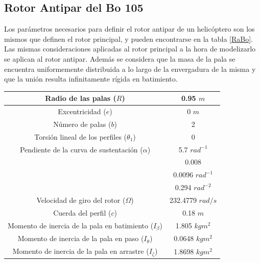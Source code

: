 \subsection{Rotor Antipar del Bo 105}

Los parámetros necesarios para definir el rotor antipar de un helicóptero son los mismos que definen el rotor principal, y pueden encontrarse en la tabla \ref{RaBo}.
Las mismas consideraciones aplicadas al rotor principal a la hora de modelizarlo se aplican al rotor antipar. Además se considera que la masa de la pala se encuentra uniformemente distribuida a lo largo de la envergadura de la misma y que la unión resulta infinitamente rígida en batimiento.
\begin{table}[htbp]
	\centering
	\begin{tabular}{|>{\columncolor{Gray}}c|c|}
		\hline
		\cellcolor{Gray}Radio de las palas ($R$) & \cellcolor[rgb]{ 1,  1,  1}0.95 $m$ \\ \hline
		\cellcolor{Gray}Excentricidad ($e$)& \cellcolor[rgb]{ 1,  1,  1}0 $m$ \\ \hline
		\cellcolor{Gray}Número de palas ($b$) & \cellcolor[rgb]{ 1,  1,  1}2 \\ \hline
		\cellcolor{Gray}Torsión lineal de los perfiles ($\theta_1$) & \cellcolor[rgb]{ 1,  1,  1}0 \\ \hline
		\cellcolor{Gray}Pendiente de la curva de sustentación ($\alpha$) & \cellcolor[rgb]{ 1,  1,  1}5.7 $rad^{-1}$ \\ \hline
		\cellcolor{Gray} & \cellcolor[rgb]{ 1,  1,  1}0.008 \\ \hhline{|~|-|}
		\cellcolor{Gray} & \cellcolor[rgb]{ 1,  1,  1}0.0096 $rad^{-1}$ \\ \hhline{|~|-|}
		\multirow{-3}{*}{\cellcolor{Gray}Parámetros de la polar ($\delta_0$, $\delta_1$, $\delta_2$)} & \cellcolor[rgb]{ 1,  1,  1}0.294 $rad^{-2}$ \\ \hline
		\cellcolor{Gray}Velocidad de giro del rotor ($\Omega$) & \cellcolor[rgb]{ 1,  1,  1}232.4779 $rad/s$ \\ \hline
		\cellcolor{Gray}Cuerda del perfil ($c$) & \cellcolor[rgb]{ 1,  1,  1}0.18 $m$ \\ \hline
		\cellcolor{Gray}Momento de inercia de la pala en batimiento ($I_\beta$) & \cellcolor[rgb]{ 1,  1,  1}1.805 $kgm^2$ \\ \hline
		\cellcolor{Gray}Momento de inercia de la pala en paso ($I_\theta$) & \cellcolor[rgb]{ 1,  1,  1}0.0648 $kgm^2$ \\ \hline
		\cellcolor{Gray}Momento de inercia de la pala en arrastre ($I_\zeta$) & \cellcolor[rgb]{ 1,  1,  1}1.8698 $kgm^2$ \\ \hline

\end{tabular}
\end{table}
